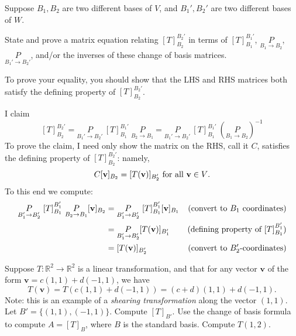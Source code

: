 Suppose $B_1, B_2$ are two different bases of $V$, and $B_1', B_2'$ are two different bases of $W$. 

State and prove a matrix equation relating $[T]_{B_2}^{B_2'}$ in terms of $[T]_{B_1}^{B_1'}$, $\underset{B_1\rightarrow B_2}{P}$, $\underset{B_1'\rightarrow B_2'}{P}$,  and/or the inverses of these change of basis matrices. 

To prove your equality, you should show that the LHS and RHS matrices both satisfy the defining property of $[T]_{B_2}^{B_2'}$. 
\\
\begin{solution}
\noindent
I claim 
\[
[T]_{B_2}^{B_2'}=\underset{B_1'\rightarrow B_2'}{P}\ [T]_{B_1}^{B_1'}\ \underset{B_2\rightarrow B_1}{P}=\underset{B_1'\rightarrow B_2'}{P}\ [T]_{B_1}^{B_1'}\ (\underset{B_1\rightarrow B_2}{P})^{-1}
\]
To prove the claim, I need only show the matrix on the RHS, call it $C$, satisfies the defining property of $[T]_{B_2}^{B_2'}$: namely, 
\[
C[{\mathbf v}]_{B_2}=[T({\mathbf v})]_{B_2'} \text{ for all ${\mathbf v}\in V$}.
\]
To this end we compute:
\begin{align*}
\underset{B_1'\rightarrow B_2'}{P}\ [T]_{B_1}^{B_1'}\ \underset{B_2\rightarrow B_1}{P}[\boldv]_{B_2}&=\underset{B_1'\rightarrow B_2'}{P}\ [T]_{B_1}^{B_1'}[\boldv]_{B_1} &\text{(convert to $B_1$ coordinates)}\\
&=\underset{B_1'\rightarrow B_2'}{P}[T(\boldv)]_{B_1'} &\text{(defining property of $[T]_{B_1}^{B_1'}$)}\\
&=[T(\boldv)]_{B_2'} &\text{(convert to $B_2'$-coordinates)}
\end{align*}
\end{solution}
\ii Suppose $T\colon \mathbb{R}^2\rightarrow\mathbb{R}^2$ is a linear transformation, and that for any vector $\mathbf{v}$ of the form $\mathbf{v}=c(1,1)+d(-1,1)$, we have 
\[
T(\mathbf{v})=T\left(c(1,1)+d(-1,1)\right)=(c+d)(1,1)+d(-1,1).
\]
Note: this is an example of a {\em shearing transformation} along the vector $(1,1)$. 
\bb
\ii Let $B'=\{(1,1), (-1,1)\}$. Compute $[T]_{B'}$. 
\ii Use the change of basis formula to compute $A=[T]_B$, where $B$ is the standard basis. 
\ii Compute $T(1,2)$. 
\ee
